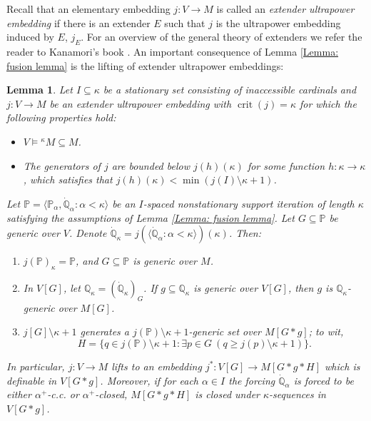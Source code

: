 \documentclass[11pt]{amsart}
\newtheorem{lemma}[theorem]{Lemma}
\theoremstyle{definition}
\theoremstyle{remark}
\newcommand\<{{<}}
\DeclareMathOperator{\crit}{crit}
\def\s{\subseteq}
\newcommand{\po}{\mathbb{P}}
\newcommand{\qo}{\mathbb{Q}}
\newcommand{\la}{\langle}
\newcommand{\ra}{\rangle}
\begin{document}
Recall that an elementary embedding $j\colon V\rightarrow M$ is called an \emph{extender ultrapower embedding} if there is an extender $E$ such that $j$ is the ultrapower embedding induced by $E$, $j_E$. For an overview of the general theory of extenders we refer the reader to Kanamori's book  \cite{Kan}. An important consequence of Lemma \ref{Lemma: fusion lemma}  is the lifting of extender ultrapower embeddings:
\begin{lemma}\label{Lemma: lifting elementary embeddings with fusion}
    Let $I\s \kappa$ be a stationary set consisting of inaccessible cardinals and  $j\colon V\to M$ be an extender ultrapower embedding with $\crit(j) = \kappa$ for which the following properties hold:
    \begin{itemize}
        \item[$(\aleph)$] $V\vDash {}^\kappa M\subseteq M$.
        \item[$(\beth)$] The generators of $j$ are bounded below $j(h)(\kappa)$ for some function $h\colon \kappa\to \kappa$, which satisfies that $j(h)(\kappa)<\min(j(I)\setminus \kappa+1)$.
    \end{itemize}
    Let $\po = \la \po_\alpha, \dot{\qo}_\alpha \colon \alpha<\kappa \ra$ be an $I$-spaced nonstationary support iteration of length $\kappa$ satisfying the assumptions of Lemma \ref{Lemma: fusion lemma}. Let $G\subseteq \po$ be generic over $V$. Denote $\dot{\qo}_\kappa = j\left( \la \dot{\qo}_\alpha \colon \alpha<\kappa \ra \right)(\kappa)$. Then:
    \begin{enumerate}
        \item \label{Clause: G is generic over M} ${j(\po)}_\kappa= \po$, and $G\subseteq \po$ is generic over $M$.
        \item \label{Clause: g is generic} In $V[G]$, let $\qo_\kappa = (\dot{\qo}_\kappa)_G$. If $g\subseteq \qo_\kappa$ is generic over $V[G]$, then $g$ is $\qo_\kappa$-generic over $M[G]$.
        \item \label{Clause: j[G] generates a generic} $j[G]\setminus \kappa+1$ generates a $j(\po)\setminus \kappa+1$-generic set over $M[G*g]$; to wit, 
    $$H= \{ q \in j(\po)\setminus \kappa+1 \colon \exists p\in G \ ( q\geq j(p)\setminus \kappa+1 )\}.$$
  
    \end{enumerate}
    In particular, $j\colon V\to M$ lifts to an embedding $j^*\colon V[G]\to M[G*g*H]$ which is definable in $V[G*g]$. Moreover, if for each $\alpha\in I$ the forcing $\dot{\qo}_\alpha$ is forced to be either  $\alpha^{+}$-c.c. or $\alpha^+$-closed, $M[G*g*H]$ is closed under $\kappa$-sequences in $V[G*g]$.
   
\end{lemma}
\end{document}
